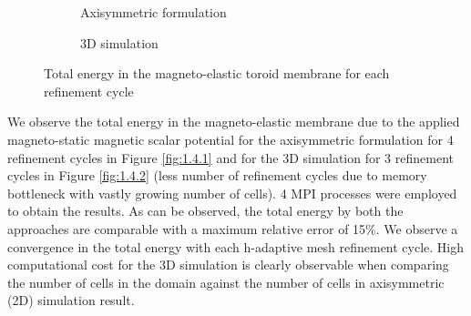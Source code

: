 \documentclass[11pt,a4paper,final]{article}
\begin{document}
\begin{figure}[t!]
\begin{subfigure}[t]{0.49\linewidth}
\centering
{}
\caption{Axisymmetric formulation}
\label{fig:1.4.1}
\end{subfigure}
\begin{subfigure}[t]{0.46\linewidth}
\centering
{}
\caption{3D simulation}
\label{fig:1.4.2}
\end{subfigure}
\caption{Total energy in the magneto-elastic toroid membrane for each refinement cycle}
\label{fig:1.4}
\end{figure} \par 

We observe the total energy in the magneto-elastic membrane due to the applied magneto-static magnetic scalar potential for the axisymmetric formulation for 4 refinement cycles in Figure \eqref{fig:1.4.1} and for the 3D simulation for 3 refinement cycles in Figure \eqref{fig:1.4.2} (less number of refinement cycles due to memory bottleneck with vastly growing number of cells). 4 MPI processes were employed to obtain the results. As can be observed, the total energy by both the approaches are comparable with a maximum relative error of 15\%. We observe a convergence in the total energy with each h-adaptive mesh refinement cycle. High computational cost for the 3D simulation is clearly observable when comparing the number of cells in the domain against the number of cells in axisymmetric (2D) simulation result. \par 
\end{document}
